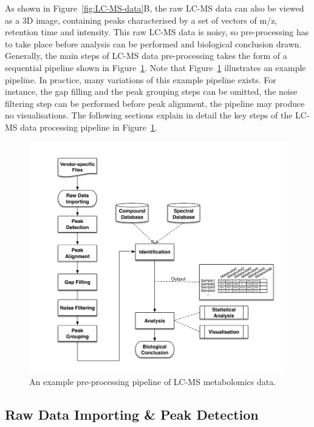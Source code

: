 As shown in Figure~\ref{fig:LC-MS-data}B, the raw LC-MS data can also be viewed as a 3D image, containing peaks characterised by a set of vectors of m/z, retention time and intensity. This raw LC-MS data is noisy, so pre-processing has to take place before analysis can be performed and biological conclusion drawn. Generally, the main steps of LC-MS data pre-processing takes the form of a sequential pipeline shown in Figure~\ref{fig:pipeline}. Note that Figure~\ref{fig:pipeline} illustrates an example pipeline. In practice, many variations of this example pipeline exists. For instance, the gap filling and the peak grouping steps can be omitted, the noise filtering step can be performed before peak alignment, the pipeline may produce no visualisations. The following sections explain in detail the key steps of the LC-MS data processing pipeline in Figure~\ref{fig:pipeline}.

\begin{figure}
\noindent \centering{}\includegraphics[width=1\textwidth]{02-background/figures/pipeline.pdf}\caption{\label{fig:pipeline}An example pre-processing pipeline of LC-MS metabolomics data.}
\end{figure}

\subsection{Raw Data Importing \& Peak Detection}

